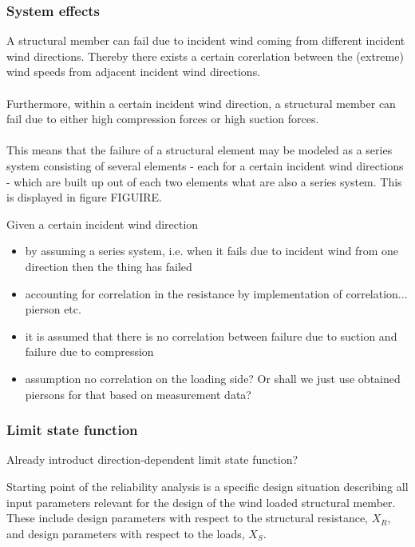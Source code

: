 %

\subsubsection{System effects}
A structural member can fail due to incident wind coming from different incident wind directions. Thereby there exists a certain corerlation between the (extreme) wind speeds from adjacent incident wind directions. \\
\\
Furthermore, within a certain incident wind direction, a structural member can fail due to either high compression forces or high suction forces.\\
\\
This means that the failure of a structural element may be modeled as a series system consisting of several elements - each for a certain incident wind directions - which are built up out of each two elements what are also a series system. This is displayed in figure FIGUIRE. 


Given a certain incident wind direction

\begin{itemize}
\item by assuming a series system, i.e. when it fails due to incident wind from one direction then the thing has failed
\item accounting for correlation in the resistance by implementation of correlation... pierson etc.
\item it is assumed that there is no correlation between failure due to suction and failure due to compression
\item assumption no correlation on the loading side? Or shall we just use obtained piersons for that based on measurement data?
\end{itemize}

\subsubsection{Limit state function}
\begin{framed}
Already introduct direction-dependent limit state function?
\end{framed}
Starting point of the reliability analysis is 
a specific design situation describing all input parameters relevant for the design of the wind loaded structural member.  These include design parameters with respect to the structural resistance, $X_R$, and design parameters with respect to the loads, $X_S$. 

